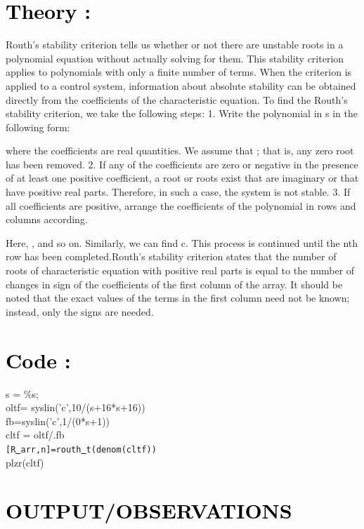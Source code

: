 \documentclass[12pt]{article}
\begin{document}
\section*{\textcolor{black}{Theory :}}
Routh’s stability criterion tells us whether or not there are unstable roots in a polynomial equation without actually solving for them. This stability criterion applies to polynomials with only a finite number of terms. When the criterion is applied to a control system, information about absolute stability can be obtained directly from the coefficients of the characteristic equation.
To find the Routh’s stability criterion, we take the following steps:
1. Write the polynomial in s in the following form:
           
where the coefficients are real quantities. We assume that ; that is, any zero root has been removed. 
2. If any of the coefficients are zero or negative in the presence of at least one positive coefficient, a root or roots exist that are imaginary or that have positive real parts. Therefore, in such a case, the system is not stable.
3. If all coefficients are positive, arrange the coefficients of the polynomial in rows and columns according.

Here,  ,  and so on. Similarly, we can find c.
This process is continued until the nth row has been completed.Routh’s stability criterion states that the number of roots of characteristic equation with positive real parts is equal to the number of changes in sign of the coefficients of the first column of the array. It should be noted that the exact values of the terms in the first column need not be known; instead, only the signs are needed.
 \par

\section*{\textcolor{black}{Code :}}
s = \%s;\\
oltf= syslin('c',10/(s+16*s+16))\\
fb=syslin('c',1/(0*s+1))\\
cltf = oltf/.fb\\
\texttt{[R\underline{{ }}arr,n]=routh\underline{{ }}t(denom(cltf))}\\
plzr(cltf)\\
   \par 

\section*{\textcolor{black}{OUTPUT/OBSERVATIONS}}
\end{document}
